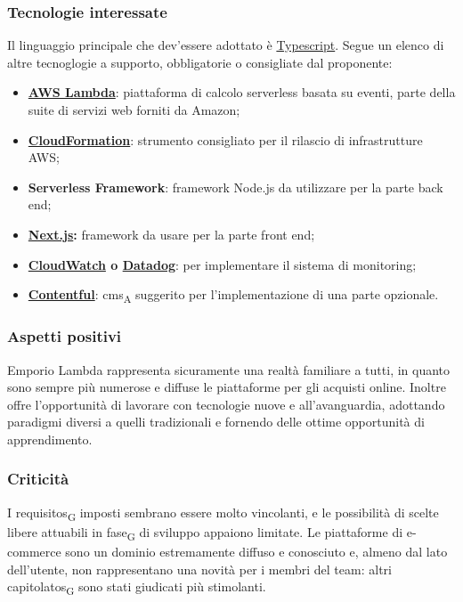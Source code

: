 \subsubsection{Tecnologie interessate}

Il linguaggio principale che dev'essere adottato è \href{https://www.typescriptlang.org/}{Typescript}. Segue un elenco di altre tecnoglogie a supporto, obbligatorie o consigliate dal proponente:
\begin{itemize}
    \item \textbf{\href{https://aws.amazon.com/it/lambda/}{AWS Lambda}}: piattaforma di calcolo serverless basata su eventi, parte della suite di servizi web forniti da Amazon;
    \item \textbf{\href{https://aws.amazon.com/it/cloudformation/}{CloudFormation}}: strumento consigliato per il rilascio di infrastrutture AWS;
    \item \textbf{Serverless Framework}: framework Node.js da utilizzare per la parte back end;
    \item \textbf{\href{https://nextjs.org/}{Next.js}:} framework da usare per la parte front end;
    \item \textbf{\href{https://aws.amazon.com/it/cloudwatch/}{CloudWatch} o \href{https://www.datadoghq.com/}{Datadog}}: per implementare il sistema di monitoring;
    \item \textbf{\href{https://www.contentful.com/}{Contentful}}: \acrshort{cms}\textsubscript{A} suggerito per l'implementazione di una parte opzionale.
\end{itemize}


\subsubsection{Aspetti positivi}

Emporio Lambda rappresenta sicuramente una realtà familiare a tutti, in quanto sono sempre più numerose e diffuse le piattaforme per gli acquisti online. Inoltre offre l'opportunità di lavorare con tecnologie nuove e all'avanguardia, adottando paradigmi diversi a quelli tradizionali e fornendo delle ottime opportunità di apprendimento.


\subsubsection{Criticità}

I \glspl{requisito}\textsubscript{G} imposti sembrano essere molto vincolanti, e le possibilità di scelte libere attuabili in \gls{fase}\textsubscript{G} di sviluppo appaiono limitate. Le piattaforme di e-commerce sono un dominio estremamente diffuso e conosciuto e, almeno dal lato dell'utente, non rappresentano una novità per i membri del team: altri \glspl{capitolato}\textsubscript{G} sono stati giudicati più stimolanti.


